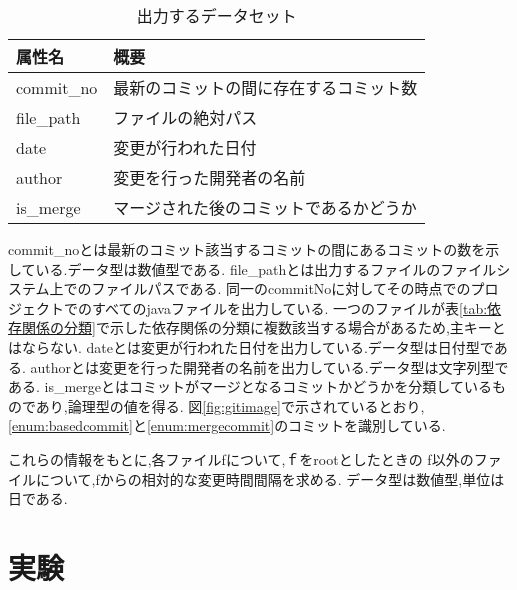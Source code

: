 \documentclass{fose2016}           %
\begin{document}
\begin{table}[htb]
\begin{center}
\caption{出力するデータセット}
\begin{tabular}{|l|l|} \hline
属性名 & 概要 \\ \hline
commit\_no & 最新のコミットの間に存在するコミット数 \\ \hline
file\_path & ファイルの絶対パス \\ \hline
date & 変更が行われた日付 \\ \hline
author & 変更を行った開発者の名前 \\ \hline
is\_merge & マージされた後のコミットであるかどうか \\ \hline
\end{tabular}
\end{center}
\label{tab:初期データセット}
\end{table}

commit\_noとは最新のコミット該当するコミットの間にあるコミットの数を示している.データ型は数値型である.
file\_pathとは出力するファイルのファイルシステム上でのファイルパスである.
同一のcommitNoに対してその時点でのプロジェクトでのすべてのjavaファイルを出力している.
一つのファイルが表\ref{tab:依存関係の分類}で示した依存関係の分類に複数該当する場合があるため,主キーとはならない.
dateとは変更が行われた日付を出力している.データ型は日付型である.
authorとは変更を行った開発者の名前を出力している.データ型は文字列型である.
is\_mergeとはコミットがマージとなるコミットかどうかを分類しているものであり,論理型の値を得る.
図\ref{fig:gitimage}で示されているとおり,\ref{enum:basedcommit}と\ref{enum:mergecommit}のコミットを識別している.

これらの情報をもとに,各ファイルfについて,ｆをrootとしたときの
f以外のファイルについて,fからの相対的な変更時間間隔を求める.
データ型は数値型,単位は日である.
\section{実験}\label{実験}

\end{document}

